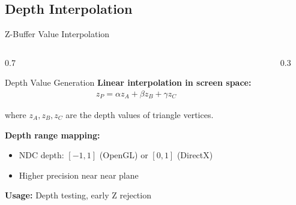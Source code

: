 \subsection{Depth Interpolation}
\begin{frame}{Z-Buffer Value Interpolation}
  \begin{columns}
    \small
    \begin{column}{0.7\textwidth}
      \begin{mathbox}{Depth Value Generation}
        \textbf{Linear interpolation in screen space:}
        \begin{align*}
          z_P = \alpha z_A + \beta z_B + \gamma z_C
        \end{align*}

        where $z_A, z_B, z_C$ are the depth values of triangle vertices.

        \vspace{0.3cm}
        \textbf{Depth range mapping:}
        \begin{itemize}
          \item NDC depth: $[-1, 1]$ (OpenGL) or $[0, 1]$ (DirectX)
          \item Higher precision near near plane
        \end{itemize}

        \vspace{0.2cm}
        \textbf{Usage:} Depth testing, early Z rejection
      \end{mathbox}
    \end{column}
    \begin{column}{0.3\textwidth}
\end{column}
\end{columns}
\end{frame}
